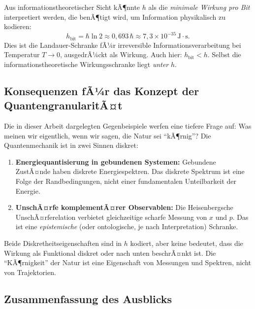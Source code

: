 ﻿\documentclass[12pt,a4paper]{article}
\theoremstyle{plain}
\theoremstyle{definition}
\theoremstyle{remark}
\begin{document}
Aus informationstheoretischer Sicht kÃ¶nnte $h$ als die \emph{minimale Wirkung pro Bit}
interpretiert werden, die benÃ¶tigt wird, um Information physikalisch zu kodieren:
\begin{equation}
  h_{\mathrm{bit}} = \hbar \ln 2 \approx 0{,}693\,\hbar \approx 7{,}3\times 10^{-35}\,\mathrm{J{\cdot}s}.
\end{equation}
Dies ist die Landauer-Schranke fÃ¼r irreversible Informationsverarbeitung bei Temperatur
$T \to 0$, ausgedrÃ¼ckt als Wirkung. Auch hier: $h_{\mathrm{bit}} < h$. Selbst die
informationstheoretische Wirkungsschranke liegt \emph{unter} $h$.

\subsection{Konsequenzen fÃ¼r das Konzept der QuantengranularitÃ¤t}

Die in dieser Arbeit dargelegten Gegenbeispiele werfen eine tiefere Frage auf: Was
meinen wir eigentlich, wenn wir sagen, die Natur sei ``kÃ¶rnig''? Die Quantenmechanik
ist in zwei Sinnen diskret:

\begin{enumerate}[leftmargin=2em]
  \item \textbf{Energiequantisierung in gebundenen Systemen:} Gebundene ZustÃ¤nde haben
    diskrete Energiespektren. Das diskrete Spektrum ist eine Folge der Randbedingungen,
    nicht einer fundamentalen Unteilbarkeit der Energie.
  \item \textbf{UnschÃ¤rfe komplementÃ¤rer Observablen:} Die Heisenbergsche UnschÃ¤rferelation
    verbietet gleichzeitige scharfe Messung von $x$ und $p$. Das ist eine
    \emph{epistemische} (oder ontologische, je nach Interpretation) Schranke.
\end{enumerate}

Beide Diskretheitseigenschaften sind in $h$ kodiert, aber keine bedeutet, dass die
Wirkung als Funktional diskret oder nach unten beschrÃ¤nkt ist. Die ``KÃ¶rnigkeit'' der
Natur ist eine Eigenschaft von Messungen und Spektren, nicht von Trajektorien.

\subsection{Zusammenfassung des Ausblicks}
\end{document}
